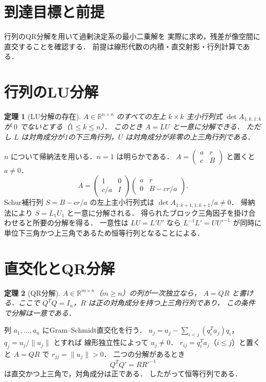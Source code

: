 \documentclass[a5paper,10pt,onecolumn]{jsarticle}
\makeatletter
\theoremstyle{mathnotetheorem}
\newtheorem{theorem}{定理}[section]
\renewcommand{\proofname}{証明}
\renewenvironment{proof}[1][\proofname]{%
  \par\pushQED{\qed}\normalfont\topsep4\p@\@plus2\p@\relax
  \trivlist\item[\hskip\labelsep\bfseries #1]\ignorespaces
}{\popQED\endtrivlist\@endpefalse}
\newcommand{\norm}[1]{\lVert #1\rVert}
\makeatother
\begin{document}
\section*{到達目標と前提}
行列のQR分解を用いて過剰決定系の最小二乗解を
実際に求め，残差が像空間に直交することを確認する．
前提は線形代数の内積・直交射影・行列計算である．

\section{行列のLU分解}
\begin{theorem}[LU分解の存在]
$A\in\mathbb R^{n\times n}$ のすべての左上 $k\times k$ 主小行列式
$\det A_{1:k,1:k}$ が $0$ でないとする（$1\le k\le n$）．
このとき $A=LU$ と一意に分解できる．
ただし $L$ は対角成分が1の下三角行列，$U$ は対角成分が非零の上三角行列である．
\end{theorem}
\begin{proof}
$n$ について帰納法を用いる．$n=1$ は明らかである．
$A=\begin{pmatrix}a&r\\c&B\end{pmatrix}$ と置くと $a\ne0$．
\[
 A=\begin{pmatrix}1&0\\c/a&I\end{pmatrix}
   \begin{pmatrix}a&r\\0&B-cr/a\end{pmatrix}.
\]
Schur補行列 $S=B-cr/a$ の左上主小行列式は
$\det A_{1:k+1,1:k+1}/a\ne0$．
帰納法により $S=L_1U_1$ と一意に分解される．
得られたブロック三角因子を掛け合わせると所要の分解を得る．
一意性は $LU=L'U'$ なら
$L^{-1}L'=UU'^{-1}$ が同時に単位下三角かつ上三角であるため恒等行列となることによる．
\end{proof}
\section{直交化とQR分解}
\begin{theorem}[QR分解]
$A\in\mathbb R^{m\times n}$（$m\ge n$）の列が一次独立なら，
$A=QR$ と書ける．ここで $Q^TQ=I_n$，$R$ は正の対角成分を持つ上三角行列であり，
この条件で分解は一意である．
\end{theorem}
\begin{proof}
列 $a_1,\ldots,a_n$ にGram--Schmidt直交化を行う．
$u_j=a_j-\sum_{i<j}(q_i^Ta_j)q_i$，$q_j=u_j/\norm{u_j}$ とすれば
線形独立性によって $u_j\ne0$．
$r_{ij}=q_i^Ta_j$（$i\le j$）と置くと $A=QR$ で $r_{jj}=\norm{u_j}>0$．
二つの分解があるとき
\[Q^TQ'=RR'^{-1}\]
は直交かつ上三角で，対角成分は正である．
したがって恒等行列である．
\end{proof}
\end{document}
